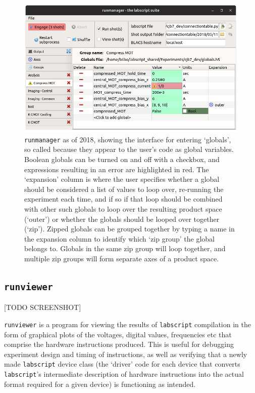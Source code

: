\begin{figure}
\begin{center}
\includegraphics[width=\textwidth]{figures/software/new_screenshots/runmanager.png}
\caption{\texttt{runmanager} as of 2018, showing the interface for entering `globals', so called because they appear to the user's code as global variables. Boolean globals can be turned on and off with a checkbox, and expressions resulting in an error are highlighted in red. The `expansion' column is where the user specifies whether a global should be considered a list of values to loop over, re-running the experiment each time, and if so if that loop should be combined with other such globals to loop over the resulting product space (`outer') or whether the globals should be looped over together (`zip'). Zipped globals can be grouped together by typing a name in the expansion column to identify which `zip group' the global belongs to. Globals in the same zip group will loop together, and multiple zip groups will form separate axes of a product space.}\label{fig:runmanager}
\end{center}
\end{figure}

\subsection{\texttt{runviewer}}

[TODO SCREENSHOT]

\texttt{runviewer} is a program for viewing the results of \texttt{labscript} compilation in the form of graphical plots of the voltages, digital values, frequencies etc that comprise the hardware instructions produced. This is useful for debugging experiment design and timing of instructions, as well as verifying that a newly made \texttt{labscript} device class (the `driver' code for each device that converts \texttt{labscript}'s intermediate description of hardware instructions into the actual format required for a given device) is functioning as intended.

